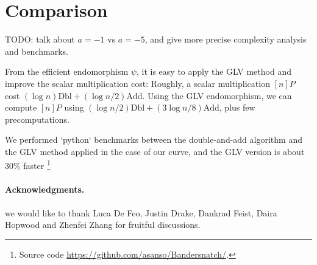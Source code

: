 \documentclass{amsart}
\newcommand{\SM}[1]{\color{blue}#1\color{black}}
\begin{document}
\section{Comparison}

\SM{TODO: talk about $a=-1$ vs $a=-5$, and give more precise complexity
analysis and benchmarks.}

From the efficient endomorphism $\psi$, it is easy to apply the GLV method and improve the scalar multiplication cost:
Roughly, a scalar multiplication $[n]P$ cost $(\log n) \text{Dbl} + (\log n/2) \text{Add}$.
Using the GLV endomorphism, we can compute $[n]P$ using $(\log n/2 )\text{Dbl} + (3\log n/8) \text{Add}$, plus few precomputations.

We performed `python` benchmarks between the double-and-add algorithm and the GLV method applied in the case of our curve, and the GLV version is about 30\% faster 
\footnote{Source code \url{https://github.com/asanso/Bandersnatch/}.}

\bigskip
\paragraph*{\textbf{Acknowledgments.}} we would like to thank Luca De Feo, Justin Drake, Dankrad Feist, Daira Hopwood and Zhenfei Zhang for fruitful discussions.



\end{document}
